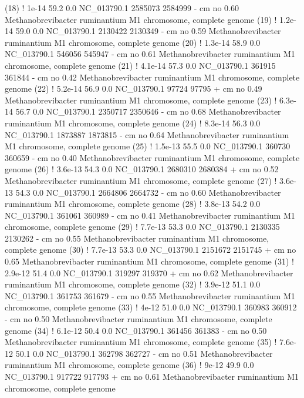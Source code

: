 \begin{sreoutput}
 (18) !     1e-14   59.2   0.0  NC_013790.1 2585073 2584999 -  cm    no 0.60  Methanobrevibacter ruminantium M1 chromosome, complete genome
 (19) !   1.2e-14   59.0   0.0  NC_013790.1 2130422 2130349 -  cm    no 0.59  Methanobrevibacter ruminantium M1 chromosome, complete genome
 (20) !   1.3e-14   58.9   0.0  NC_013790.1  546056  545947 -  cm    no 0.61  Methanobrevibacter ruminantium M1 chromosome, complete genome
 (21) !   4.1e-14   57.3   0.0  NC_013790.1  361915  361844 -  cm    no 0.42  Methanobrevibacter ruminantium M1 chromosome, complete genome
 (22) !   5.2e-14   56.9   0.0  NC_013790.1   97724   97795 +  cm    no 0.49  Methanobrevibacter ruminantium M1 chromosome, complete genome
 (23) !   6.3e-14   56.7   0.0  NC_013790.1 2350717 2350646 -  cm    no 0.68  Methanobrevibacter ruminantium M1 chromosome, complete genome
 (24) !   8.3e-14   56.3   0.0  NC_013790.1 1873887 1873815 -  cm    no 0.64  Methanobrevibacter ruminantium M1 chromosome, complete genome
 (25) !   1.5e-13   55.5   0.0  NC_013790.1  360730  360659 -  cm    no 0.40  Methanobrevibacter ruminantium M1 chromosome, complete genome
 (26) !   3.6e-13   54.3   0.0  NC_013790.1 2680310 2680384 +  cm    no 0.52  Methanobrevibacter ruminantium M1 chromosome, complete genome
 (27) !   3.6e-13   54.3   0.0  NC_013790.1 2664806 2664732 -  cm    no 0.60  Methanobrevibacter ruminantium M1 chromosome, complete genome
 (28) !   3.8e-13   54.2   0.0  NC_013790.1  361061  360989 -  cm    no 0.41  Methanobrevibacter ruminantium M1 chromosome, complete genome
 (29) !   7.7e-13   53.3   0.0  NC_013790.1 2130335 2130262 -  cm    no 0.55  Methanobrevibacter ruminantium M1 chromosome, complete genome
 (30) !   7.7e-13   53.3   0.0  NC_013790.1 2151672 2151745 +  cm    no 0.65  Methanobrevibacter ruminantium M1 chromosome, complete genome
 (31) !   2.9e-12   51.4   0.0  NC_013790.1  319297  319370 +  cm    no 0.62  Methanobrevibacter ruminantium M1 chromosome, complete genome
 (32) !   3.9e-12   51.1   0.0  NC_013790.1  361753  361679 -  cm    no 0.55  Methanobrevibacter ruminantium M1 chromosome, complete genome
 (33) !     4e-12   51.0   0.0  NC_013790.1  360983  360912 -  cm    no 0.50  Methanobrevibacter ruminantium M1 chromosome, complete genome
 (34) !   6.1e-12   50.4   0.0  NC_013790.1  361456  361383 -  cm    no 0.50  Methanobrevibacter ruminantium M1 chromosome, complete genome
 (35) !   7.6e-12   50.1   0.0  NC_013790.1  362798  362727 -  cm    no 0.51  Methanobrevibacter ruminantium M1 chromosome, complete genome
 (36) !     9e-12   49.9   0.0  NC_013790.1  917722  917793 +  cm    no 0.61  Methanobrevibacter ruminantium M1 chromosome, complete genome

\end{sreoutput}
